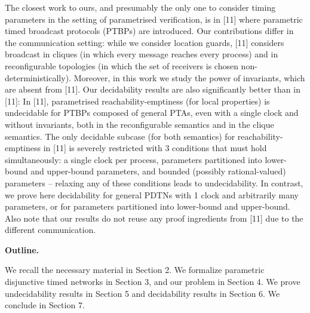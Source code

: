\documentclass[10pt,a4paper]{article}
\begin{document}
The closest work to ours, and presumably the only one to consider timing parameters in the setting of parametrised verification, is in [11] where parametric timed broadcast protocols (PTBPs) are introduced. Our contributions differ in the communication setting: while we consider location guards, [11] considers broadcast in cliques (in which every message reaches every process) and in reconfigurable topologies (in which the set of receivers is chosen non-deterministically). Moreover, in this work we study the power of invariants, which are absent from [11]. Our decidability results are also significantly better than in [11]: In [11], parametrised reachability-emptiness (for local properties) is undecidable for PTBPs composed of general PTAs, even with a single clock and without invariants, both in the reconfigurable semantics and in the clique semantics. The only decidable subcase (for both semantics) for reachability-emptiness in [11] is severely restricted with 3 conditions that must hold simultaneously: a single clock per process, parameters partitioned into lower-bound and upper-bound parameters, and bounded (possibly rational-valued) parameters -- relaxing any of these conditions leads to undecidability. In contrast, we prove here decidability for general PDTNs with 1 clock and arbitrarily many parameters, or for parameters partitioned into lower-bound and upper-bound. Also note that our results do not reuse any proof ingredients from [11] due to the different communication.\par
 
 
 
 
\par\medskip\noindent\textbf{Outline.}\par
 
 
We recall the necessary material in Section 2. We formalize parametric disjunctive timed networks in Section 3, and our problem in Section 4. We prove undecidability results in Section 5 and decidability results in Section 6. We conclude in Section 7.\par
 
 
 
 
\end{document}
